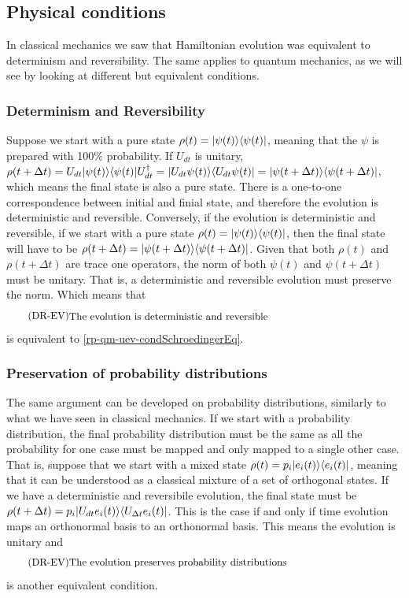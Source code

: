 \subsection{Physical conditions}

In classical mechanics we saw that Hamiltonian evolution was equivalent to determinism and reversibility. The same applies to quantum mechanics, as we will see by looking at different but equivalent conditions.

\subsubsection{Determinism and Reversibility}
Suppose we start with a pure state $\rho(t) = |\psi(t) \rangle \langle \psi(t)|$, meaning that the $\psi$ is prepared with 100\% probability. If $U_{dt}$ is unitary, $\rho(t+\Delta t) = U_{dt}|\psi(t) \rangle \langle \psi(t)|U_{dt}^{\dagger} = |U_{dt}\psi(t) \rangle \langle U_{dt}\psi(t)| = |\psi(t+\Delta t) \rangle \langle \psi(t+\Delta t)|$, which means the final state is also a pure state. There is a one-to-one correspondence between initial and finial state, and therefore the evolution is deterministic and reversible. Conversely, if the evolution is deterministic and reversible, if we start with a pure state $\rho(t) = |\psi(t) \rangle \langle \psi(t)|$, then the final state will have to be $\rho(t+\Delta t) = |\psi(t+\Delta t) \rangle \langle \psi(t+\Delta t)|$. Given that both $\rho(t)$ and $\rho(t + \Delta t)$ are trace one operators, the norm of both $\psi(t)$ and $\psi(t+\Delta t)$ must be unitary. That is, a deterministic and reversible evolution must preserve the norm. Which means that 
\begin{equation}\label{rp-qm-uev-condDetRev}
	\tag{DR-EV}
	\eqtext{The evolution is deterministic and reversible}
\end{equation}
is equivalent to \ref{rp-qm-uev-condSchroedingerEq}.

\subsubsection{Preservation of probability distributions}
The same argument can be developed on probability distributions, similarly to what we have seen in classical mechanics. If we start with a probability distribution, the final probability distribution must be the same as all the probability for one case must be mapped and only mapped to a single other case. That is, suppose that we start with a mixed state $\rho(t) = p_i |e_i(t) \rangle \langle e_i(t)|$, meaning that it can be understood as a classical mixture of a set of orthogonal states. If we have a deterministic and reversibile evolution, the final state must be $\rho(t+ \Delta t) = p_i |U_{dt}e_i(t) \rangle \langle U_{\Delta t} e_i(t)|$. This is the case if and only if time evolution maps an orthonormal basis to an orthonormal basis. This means the evolution is unitary and 
\begin{equation}\label{rp-qm-uev-condProbTrans}
	\tag{DR-EV}
	\eqtext{The evolution preserves probability distributions} 
\end{equation}
is another equivalent condition.

